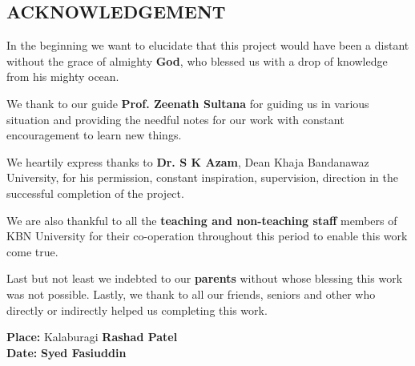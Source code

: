 \begin{center}
    \textcolor{RawSienna}{\section*{ACKNOWLEDGEMENT}}
\end{center}

In the beginning we want to elucidate that this project would have been a
distant without the grace of almighty \textcolor{RawSienna}{\textbf{God}}, who
blessed us with a drop of knowledge from his mighty ocean.

We thank to our guide \textcolor{RawSienna}{\textbf{Prof. Zeenath Sultana}} for
guiding us in various situation and providing the needful notes for our work
with constant encouragement to learn new things.

We heartily express thanks to \textcolor{RawSienna}{\textbf{Dr. S K Azam}},
Dean Khaja Bandanawaz University, for his permission, constant inspiration,
supervision, direction in the successful completion of the project.

We are also thankful to all the \textcolor{RawSienna}{\textbf{teaching and
non-teaching staff}} members of KBN University for their co-operation
throughout this period to enable this work come true.

Last but not least we indebted to our \textcolor{RawSienna}{\textbf{parents}}
without whose blessing this work was not possible. Lastly, we thank to all our
friends, seniors and other who directly or indirectly helped us completing this
work.

\begin{flushleft}
\vskip 0.5in
    \textbf{Place:} Kalaburagi \hfill \textcolor{RawSienna}{\textbf{Rashad Patel}}\\
    \textbf{Date:} \hfill \textcolor{RawSienna}{\textbf{Syed Fasiuddin}}
\end{flushleft}
